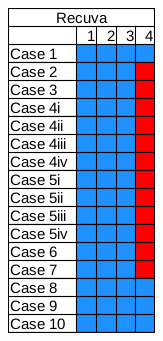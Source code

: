 \begin{figure}[h]
\begin{subfigure}{0.17\linewidth}
    \end{subfigure}~~
    \begin{subfigure}{0.17\linewidth}
        \includegraphics[width=\linewidth]{fig/recuva_results_fat.png}

\end{subfigure}
\end{figure}
